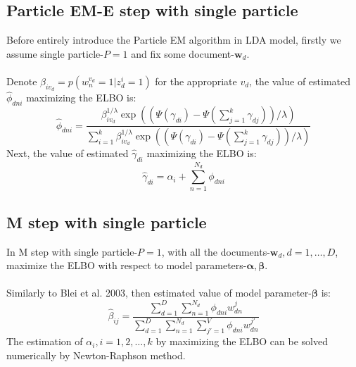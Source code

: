 \documentclass{article}
\newcommand{\bs}{\boldsymbol}
\begin{document}
\subsection{Particle EM-E step with single particle}
Before entirely introduce the Particle EM algorithm in LDA model, firstly we assume single particle-$P=1$ and fix some document-$\bs{w}_d$.\\
\\
Denote $\beta_{iv_d}=p(w_n^{v_d}=1|z_d^i=1)$ for the appropriate $v_d$, the value of estimated $\hat{\phi}_{dni}$ maximizing the ELBO is:\\
\[
\hat{\phi}_{dni}=\frac{\beta_{iv_d}^{1/\lambda}\exp((\Psi(\gamma_{di})-\Psi(\sum_{j=1}^{k}\gamma_{dj}))/\lambda)}{\sum_{i=1}^{k}\beta_{iv_d}^{1/\lambda}\exp((\Psi(\gamma_{di})-\Psi(\sum_{j=1}^{k}\gamma_{dj}))/\lambda)}
\]
Next, the value of estimated $\hat{\gamma}_{di}$ maximizing the ELBO is:\\
\[
\hat{\gamma}_{di}=\alpha_i+\sum_{n=1}^{N_d}\phi_{dni}
\]
\subsection{M step with single particle}
In M step with single particle-$P=1$, with all the documents-$\bs{w}_d,d=1,\ldots,D$, maximize the  ELBO with respect to model parameters-$\bs{\alpha},\bs{\beta}$.\\
\\
Similarly to Blei et al. 2003, then estimated value of model parameter-$\bs{\beta}$ is:\\
\[
\hat{\beta}_{ij}=\frac{\sum_{d=1}^{D}\sum_{n=1}^{N_d}\phi_{dni}w_{dn}^j}{\sum_{d=1}^{D}\sum_{n=1}^{N_d}\sum_{j'=1}^{V}\phi_{dni}w_{dn}^{j'}}
\]
The estimation of $\alpha_{i},i=1,2,\ldots,k$ by maximizing the ELBO can be solved numerically by Newton-Raphson method.
\end{document}
